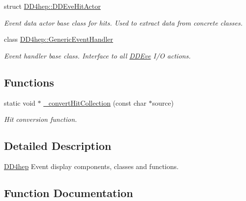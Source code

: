 \begin{DoxyCompactItemize}
\item 
struct \hyperlink{struct_d_d4hep_1_1_d_d_eve_hit_actor}{D\+D4hep\+::\+D\+D\+Eve\+Hit\+Actor}
\begin{DoxyCompactList}\small\item\em Event data actor base class for hits. Used to extract data from concrete classes. \end{DoxyCompactList}\item 
class \hyperlink{class_d_d4hep_1_1_generic_event_handler}{D\+D4hep\+::\+Generic\+Event\+Handler}
\begin{DoxyCompactList}\small\item\em Event handler base class. Interface to all \hyperlink{struct_d_d4hep_1_1_d_d_eve}{D\+D\+Eve} I/O actions. \end{DoxyCompactList}\end{DoxyCompactItemize}
\subsection*{Functions}
\begin{DoxyCompactItemize}
\item 
static void $\ast$ \hyperlink{group___d_d4_h_e_p___e_v_e_ga30000df70702f887aa93807c1cdb0cab}{\+\_\+convert\+Hit\+Collection} (const char $\ast$source)
\begin{DoxyCompactList}\small\item\em Hit conversion function. \end{DoxyCompactList}\end{DoxyCompactItemize}


\subsection{Detailed Description}
\hyperlink{namespace_d_d4hep}{D\+D4hep} Event display components, classes and functions. 



\subsection{Function Documentation}
\hypertarget{group___d_d4_h_e_p___e_v_e_ga30000df70702f887aa93807c1cdb0cab}{}\label{group___d_d4_h_e_p___e_v_e_ga30000df70702f887aa93807c1cdb0cab} 
